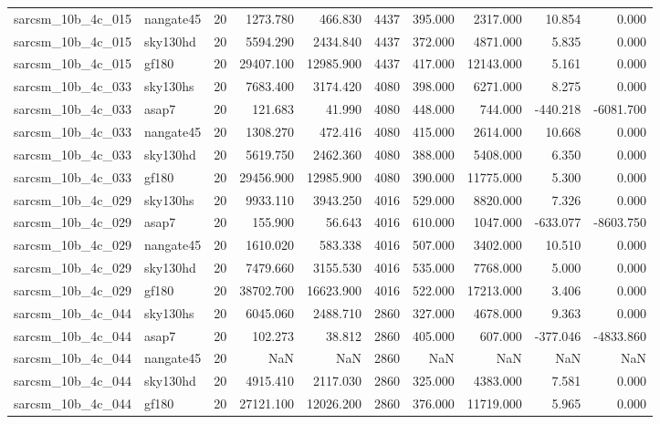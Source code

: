 \begin{tabular}{llrrrrrrrr}
sarcsm\_10b\_4c\_015 & nangate45 & 20 & 1273.780 & 466.830 & 4437 & 395.000 & 2317.000 & 10.854 & 0.000 \\
sarcsm\_10b\_4c\_015 & sky130hd & 20 & 5594.290 & 2434.840 & 4437 & 372.000 & 4871.000 & 5.835 & 0.000 \\
sarcsm\_10b\_4c\_015 & gf180 & 20 & 29407.100 & 12985.900 & 4437 & 417.000 & 12143.000 & 5.161 & 0.000 \\
sarcsm\_10b\_4c\_033 & sky130hs & 20 & 7683.400 & 3174.420 & 4080 & 398.000 & 6271.000 & 8.275 & 0.000 \\
sarcsm\_10b\_4c\_033 & asap7 & 20 & 121.683 & 41.990 & 4080 & 448.000 & 744.000 & -440.218 & -6081.700 \\
sarcsm\_10b\_4c\_033 & nangate45 & 20 & 1308.270 & 472.416 & 4080 & 415.000 & 2614.000 & 10.668 & 0.000 \\
sarcsm\_10b\_4c\_033 & sky130hd & 20 & 5619.750 & 2462.360 & 4080 & 388.000 & 5408.000 & 6.350 & 0.000 \\
sarcsm\_10b\_4c\_033 & gf180 & 20 & 29456.900 & 12985.900 & 4080 & 390.000 & 11775.000 & 5.300 & 0.000 \\
sarcsm\_10b\_4c\_029 & sky130hs & 20 & 9933.110 & 3943.250 & 4016 & 529.000 & 8820.000 & 7.326 & 0.000 \\
sarcsm\_10b\_4c\_029 & asap7 & 20 & 155.900 & 56.643 & 4016 & 610.000 & 1047.000 & -633.077 & -8603.750 \\
sarcsm\_10b\_4c\_029 & nangate45 & 20 & 1610.020 & 583.338 & 4016 & 507.000 & 3402.000 & 10.510 & 0.000 \\
sarcsm\_10b\_4c\_029 & sky130hd & 20 & 7479.660 & 3155.530 & 4016 & 535.000 & 7768.000 & 5.000 & 0.000 \\
sarcsm\_10b\_4c\_029 & gf180 & 20 & 38702.700 & 16623.900 & 4016 & 522.000 & 17213.000 & 3.406 & 0.000 \\
sarcsm\_10b\_4c\_044 & sky130hs & 20 & 6045.060 & 2488.710 & 2860 & 327.000 & 4678.000 & 9.363 & 0.000 \\
sarcsm\_10b\_4c\_044 & asap7 & 20 & 102.273 & 38.812 & 2860 & 405.000 & 607.000 & -377.046 & -4833.860 \\
sarcsm\_10b\_4c\_044 & nangate45 & 20 & NaN & NaN & 2860 & NaN & NaN & NaN & NaN \\
sarcsm\_10b\_4c\_044 & sky130hd & 20 & 4915.410 & 2117.030 & 2860 & 325.000 & 4383.000 & 7.581 & 0.000 \\
sarcsm\_10b\_4c\_044 & gf180 & 20 & 27121.100 & 12026.200 & 2860 & 376.000 & 11719.000 & 5.965 & 0.000 \\

\end{tabular}
